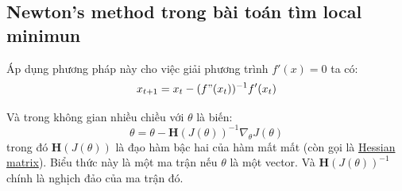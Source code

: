  
\subsection{Newton's method trong bài toán tìm local minimun}
Áp dụng phương pháp này cho việc giải phương trình $f'(x) = 0$ ta có: 
\begin{equation*} 
x_{t+1} = x_t -(f"(x_t))^{-1}{f'(x_t)} 
\end{equation*} 
 
Và trong không gian nhiều chiều với $\theta$ là biến: 
\begin{equation*} 
\theta = \theta - \mathbf{H}(J(\theta))^{-1} \nabla_{\theta} J(\theta) 
\end{equation*} 
trong đó $\mathbf{H}(J(\theta))$ là đạo hàm bậc hai của hàm mất mất (còn gọi là \href{https://en.wikipedia.org/wiki/Hessian_matrix}{Hessian matrix}). Biểu thức này là một ma trận nếu $\theta$ là một vector. Và $\mathbf{H}(J(\theta))^{-1}$ chính là nghịch đảo của ma trận đó.  
 
 
 
